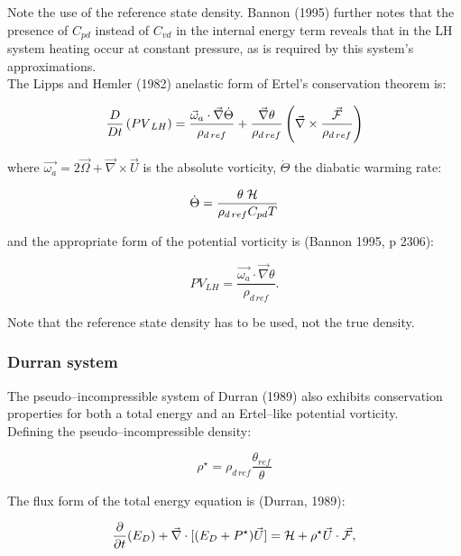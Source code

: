 Note the use of the reference state density. Bannon (1995) further notes that the
presence of $C_{pd}$ instead of $C_{vd}$ in the
internal energy term reveals that in the LH system heating occur at
constant pressure, as is required by this system's approximations. \\

The Lipps and Hemler (1982) anelastic form of Ertel's conservation theorem is:

\begin{equation}
\dfrac{D}{Dt}\left({PV}_{LH}\right) =
\dfrac{\vec{\omega}_a \cdot \vec{\nabla} \dot{\Theta}}{\rho_{d\,ref}}
+ \dfrac{\vec{\nabla}\theta}{\rho_{d\,ref}}
\left(\vec{\nabla}\times\dfrac{\vec{\cal F}}{\rho_{d\,ref}}\right)
\end{equation}

where $\vec{\omega_a}  = 2 \vec{\Omega} + \vec{\nabla}\times\vec{U}$ is the absolute
vorticity, $\dot{\Theta}$ the diabatic warming rate:

\begin{equation}
\dot{\Theta} = \dfrac{\theta\; \cal H}{\rho_{d\,ref} C_{pd} T}
\end{equation}

and the appropriate form of the potential vorticity is (Bannon 1995, p 2306):

\begin{equation}
{PV}_{LH} = \dfrac{\vec{\omega_a} \cdot \vec{\nabla} \theta}{\rho_{d\,ref}}.
\end{equation}

Note that the reference state density has to be used, not the true density.

\subsubsection{Durran system}

The pseudo--incompressible system of Durran (1989) also exhibits conservation properties
for both a total energy and an Ertel--like potential vorticity. \\

Defining the pseudo--incompressible density:

\begin{equation}
\rho^{\star} = \rho_{d\,ref} \dfrac{\theta_{ref}}{\theta}
\end{equation}

The flux form of the total energy equation is (Durran, 1989):

\begin{equation}
\dfrac{\partial}{\partial t}(E_{D})
 + \vec{ \nabla} \cdot [(E_{D} + P^{\star}) \vec{U}]
    = {\cal H} + \rho^{\star} \vec{U} \cdot  \vec{\cal F},
\end{equation}

